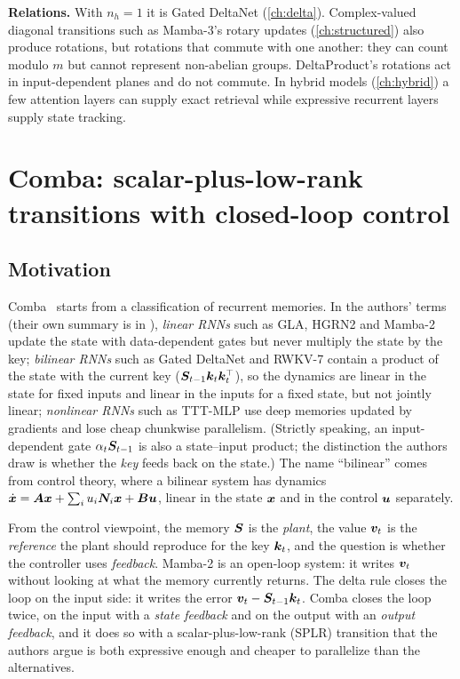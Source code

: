 \textbf{Relations.} With $n_h=1$ it is Gated DeltaNet (\cref{ch:delta}). Complex-valued
diagonal transitions such as Mamba-3's rotary updates (\cref{ch:structured}) also produce
rotations, but rotations that commute with one another: they can count modulo $m$ but cannot
represent non-abelian groups. DeltaProduct's rotations act in input-dependent planes and do
not commute. In hybrid models (\cref{ch:hybrid}) a few attention layers can supply exact
retrieval while expressive recurrent layers supply state tracking.

\section{Comba: scalar-plus-low-rank transitions with closed-loop control}\label{sec:c06-comba}

\subsection{Motivation}

Comba~\citep{hu2025comba} starts from a classification of recurrent memories. In the
authors' terms (their own summary is in
), \emph{linear RNNs}
such as GLA, HGRN2 and Mamba-2 update the state with data-dependent gates but never multiply
the state by the key; \emph{bilinear RNNs} such as Gated DeltaNet and RWKV-7 contain a
product of the state with the current key ($\bm{S}_{t-1}\bm{k}_t\bm{k}_t^{\top}$), so the dynamics are
linear in the state for fixed inputs and linear in the inputs for a fixed state, but not
jointly linear; \emph{nonlinear RNNs} such as TTT-MLP use deep memories updated by gradients
and lose cheap chunkwise parallelism. (Strictly speaking, an input-dependent gate
$\alpha_t\bm{S}_{t-1}$ is also a state--input product; the distinction the authors draw is
whether the \emph{key} feeds back on the state.) The name ``bilinear'' comes from control
theory, where a bilinear system has dynamics
$\dot{\bm{x}}=\bm{A}\bm{x}+\sum_iu_i\bm{N}_i\bm{x}+\bm{B}\bm{u}$, linear in the state $\bm{x}$ and in the control
$\bm{u}$ separately.

From the control viewpoint, the memory $\bm{S}$ is the \emph{plant}, the value $\bm{v}_t$ is the
\emph{reference} the plant should reproduce for the key $\bm{k}_t$, and the question is whether
the controller uses \emph{feedback}. Mamba-2 is an open-loop system: it writes $\bm{v}_t$
without looking at what the memory currently returns. The delta rule closes the loop on
the input side: it writes the error $\bm{v}_t-\bm{S}_{t-1}\bm{k}_t$. Comba closes the loop twice,
on the input with a \emph{state feedback} and on the output with an \emph{output feedback},
and it does so with a scalar-plus-low-rank (SPLR) transition that the authors argue is both
expressive enough and cheaper to parallelize than the alternatives.

